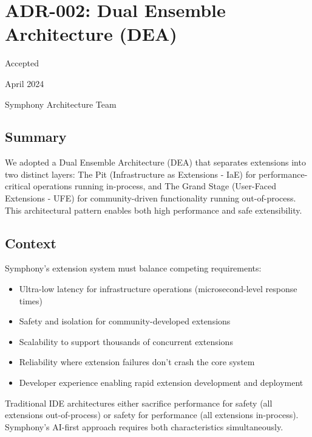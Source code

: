 \section*{ADR-002: Dual Ensemble Architecture (DEA)}

\begin{description}[leftmargin=3cm,labelwidth=2.5cm]
\item[\textbf{Status}] Accepted
\item[\textbf{Date}] April 2024
\item[\textbf{Authors}] Symphony Architecture Team
\end{description}

\subsection*{Summary}

We adopted a Dual Ensemble Architecture (DEA) that separates extensions into two distinct layers: The Pit (Infrastructure as Extensions - IaE) for performance-critical operations running in-process, and The Grand Stage (User-Faced Extensions - UFE) for community-driven functionality running out-of-process. This architectural pattern enables both high performance and safe extensibility.

\subsection*{Context}

Symphony's extension system must balance competing requirements:

\begin{itemize}
\item Ultra-low latency for infrastructure operations (microsecond-level response times)
\item Safety and isolation for community-developed extensions
\item Scalability to support thousands of concurrent extensions
\item Reliability where extension failures don't crash the core system
\item Developer experience enabling rapid extension development and deployment
\end{itemize}

Traditional IDE architectures either sacrifice performance for safety (all extensions out-of-process) or safety for performance (all extensions in-process). Symphony's AI-first approach requires both characteristics simultaneously.

